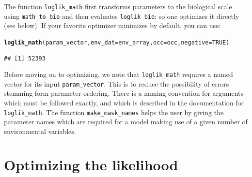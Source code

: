 \documentclass[11pt]{article}\usepackage[]{graphicx}\usepackage[]{xcolor}
\makeatletter
\newcommand{\hlnum}[1]{\textcolor[rgb]{0.686,0.059,0.569}{#1}}%
\newcommand{\hldef}[1]{\textcolor[rgb]{0.345,0.345,0.345}{#1}}%
\newcommand{\hlkwc}[1]{\textcolor[rgb]{0.333,0.667,0.333}{#1}}%
\newcommand{\hlkwd}[1]{\textcolor[rgb]{0.737,0.353,0.396}{\textbf{#1}}}%
\newenvironment{kframe}{%
 \def\at@end@of@kframe{}%
 \ifinner\ifhmode%
  \def\at@end@of@kframe{\end{minipage}}%
  \begin{minipage}{\columnwidth}%
 \fi\fi%
 \def\FrameCommand##1{\hskip\@totalleftmargin \hskip-\fboxsep
 \colorbox{shadecolor}{##1}\hskip-\fboxsep
     \hskip-\linewidth \hskip-\@totalleftmargin \hskip\columnwidth}%
 \MakeFramed {\advance\hsize-\width
   \@totalleftmargin\z@ \linewidth\hsize
   \@setminipage}}%
 {\par\unskip\endMakeFramed%
 \at@end@of@kframe}
\newenvironment{knitrout}{}{} %
\makeatother
\begin{document}
\noindent The function \texttt{loglik\_math} first transforms parameters to the 
biological scale using \texttt{math\_to\_bio} and
then evaluates \texttt{loglik\_bio}; so one optimizes it directly 
(see below). If your favorite optimizer minimizes by default, you can use:
\begin{knitrout}
\color{fgcolor}\begin{kframe}
\begin{alltt}
\hlkwd{loglik_math}\hldef{(param_vector,} \hlkwc{env_dat} \hldef{= env_array,} \hlkwc{occ} \hldef{= occ,} \hlkwc{negative} \hldef{=} \hlnum{TRUE}\hldef{)}
\end{alltt}
\begin{verbatim}
## [1] 52393
\end{verbatim}
\end{kframe}
\end{knitrout}
\noindent Before moving on to optimizing, we note that \texttt{loglik\_math}
requires a named vector for its input \texttt{param\_vector}. This is to reduce
the possibility of errors stemming form parameter ordering. There is a 
naming convention for arguments which must be followed exactly, and which is described 
in the documentation for \texttt{loglik\_math}. 
The function \texttt{make\_mask\_names} helps the user by giving the parameter names which
are required for a model making use of a given number of environmental variables.

\section{Optimizing the likelihood}
\end{document}
